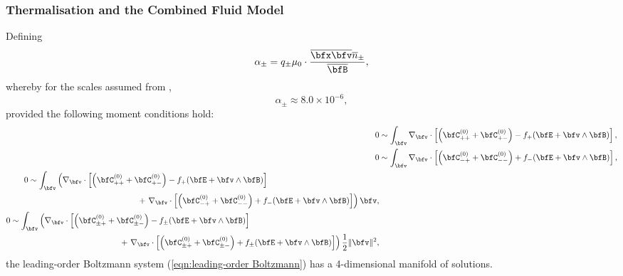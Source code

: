 \subsubsection*{Thermalisation and the Combined Fluid Model}

    \begin{lemma}
        Defining
        \begin{equation}
            \alpha_{\pm}  =  q_{\pm}\mu_{0}\cdot\frac{\overline{\bfx}\overline{\bfv}\overline{n}_{\pm}}{\overline{\bfB}},
        \end{equation}
        whereby for the scales assumed from \cite{Wes00},
        \begin{equation}
            \alpha_{\pm}  \approx  8.0\times 10^{- 6},
        \end{equation}
        provided the following moment conditions hold:
        \begin{align}
            0  &\sim  \int_{\bfv}\nabla_{\bfv}\cdot\left[\left(\bfC_{++}^{(0)} + \bfC_{+-}^{(0)}\right) - f_{+}(\bfE + \bfv\wedge\bfB)\right],  \label{eqn:leading-order + conservation}  \\
            0  &\sim  \int_{\bfv}\nabla_{\bfv}\cdot\left[\left(\bfC_{-+}^{(0)} + \bfC_{--}^{(0)}\right) + f_{-}(\bfE + \bfv\wedge\bfB)\right],  \label{eqn:leading-order - conservation}  \\
            \begin{split}
                0  &\sim  \int_{\bfv}\left(\nabla_{\bfv}\cdot\left[\left(\bfC_{++}^{(0)} + \bfC_{+-}^{(0)}\right) - f_{+}(\bfE + \bfv\wedge\bfB)\right]\right.  \\
                &\;\;\;\;\;\;\;\;\;\;\;\;\;\;\;\;\;\;\;\;\;\;\;\;\;\;\;\;\;\;\;\;\;\;\;\;\;\;\;\;\;\;\;\;\;\;\;\;+ \left.\nabla_{\bfv}\cdot\left[\left(\bfC_{-+}^{(0)} + \bfC_{--}^{(0)}\right) + f_{-}(\bfE + \bfv\wedge\bfB)\right]\right)\bfv,
            \end{split}  \label{eqn:leading-order momentum conservation}  \\
            \begin{split}
                0  &\sim  \int_{\bfv}\left(\nabla_{\bfv}\cdot\left[\left(\bfC_{\pm+}^{(0)} + \bfC_{\pm-}^{(0)}\right) - f_{\pm}(\bfE + \bfv\wedge\bfB)\right]\right.  \\
                &\;\;\;\;\;\;\;\;\;\;\;\;\;\;\;\;\;\;\;\;\;\;\;\;\;\;\;\;\;\;\;\;\;\;\;\;\;\;\;\;\;\;\;\;\;\;\;\;+ \left.\nabla_{\bfv}\cdot\left[\left(\bfC_{\pm+}^{(0)} + \bfC_{\pm-}^{(0)}\right) + f_{\pm}(\bfE + \bfv\wedge\bfB)\right]\right)\frac{1}{2}\|\bfv\|^{2},
            \end{split}  \label{eqn:leading-order energy conservation}
        \end{align}
        the leading-order Boltzmann system (\ref{eqn:leading-order Boltzmann}) has a 4-dimensional manifold of solutions. 
    \end{lemma}

